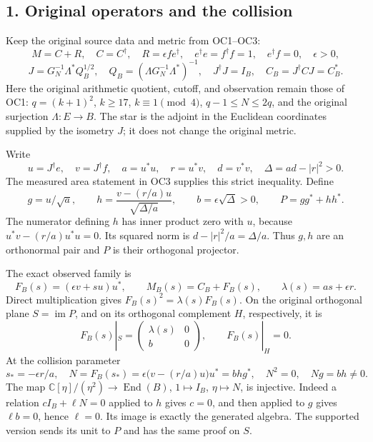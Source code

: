 \documentclass[
  10pt,
  a4paper,
]{article}
\begin{document}
\subsection{1. Original operators and the
collision}\label{original-operators-and-the-collision}

Keep the original source data and metric from OC1--OC3: \[
M=C+R,\quad C=C^\dagger,\quad R=\epsilon fe^\dagger,
\quad e^\dagger e=f^\dagger f=1,\quad e^\dagger f=0,\quad\epsilon>0,
\] \[
J=G_N^{-1}\Lambda^*Q_B^{1/2},\quad
Q_B=(\Lambda G_N^{-1}\Lambda^*)^{-1},\quad J^\dagger J=I_B,
\quad C_B=J^\dagger CJ=C_B^*.
\tag{ISP1}
\] Here the original arithmetic quotient, cutoff, and observation remain
those of OC1: \(q=(k+1)^2\), \(k\ge17\), \(k\equiv1\pmod4\),
\(q-1\le N\le2q\), and the original surjection \(\Lambda:E\to B\). The
star is the adjoint in the Euclidean coordinates supplied by the
isometry \(J\); it does not change the original metric.

Write \[
u=J^\dagger e,\quad v=J^\dagger f,\quad
a=u^*u,\quad r=u^*v,\quad d=v^*v,\quad
\Delta=ad-|r|^2>0.
\] The measured area statement in OC3 supplies this strict inequality.
Define \[
g=u/\sqrt a,\qquad
h=\frac{v-(r/a)u}{\sqrt{\Delta/a}},\qquad
b=\epsilon\sqrt\Delta>0,\qquad P=gg^*+hh^*.
\tag{ISP2}
\] The numerator defining \(h\) has inner product zero with \(u\),
because \(u^*v-(r/a)u^*u=0\). Its squared norm is
\(d-|r|^2/a=\Delta/a\). Thus \(g,h\) are an orthonormal pair and \(P\)
is their orthogonal projector.

The exact observed family is \[
F_B(s)=(\epsilon v+su)u^*,\qquad
M_B(s)=C_B+F_B(s),\qquad
\lambda(s)=as+\epsilon r.
\tag{ISP3}
\] Direct multiplication gives \(F_B(s)^2=\lambda(s)F_B(s)\). On the
original orthogonal plane \(S=\operatorname{im}P\), and on its
orthogonal complement \(H\), respectively, it is \[
F_B(s)|_S=\begin{pmatrix}\lambda(s)&0\\b&0\end{pmatrix},
\qquad F_B(s)|_H=0.
\tag{ISP4}
\] At the collision parameter \[
s_*=-\epsilon r/a,
\quad N=F_B(s_*)=\epsilon\bigl(v-(r/a)u\bigr)u^*=bhg^*,
\quad N^2=0,\quad Ng=bh\ne0.
\tag{ISP5}
\] The map \(\mathbb C[\eta]/(\eta^2)\to\operatorname{End}(B)\),
\(1\mapsto I_B\), \(\eta\mapsto N\), is injective. Indeed a relation
\(cI_B+\ell N=0\) applied to \(h\) gives \(c=0\), and then applied to
\(g\) gives \(\ell b=0\), hence \(\ell=0\). Its image is exactly the
generated algebra. The supported version sends its unit to \(P\) and has
the same proof on \(S\).
\end{document}
